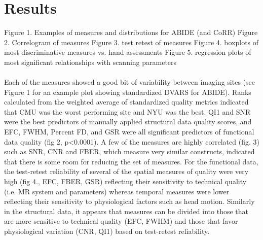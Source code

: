 \documentclass{frontiersSCNS} %
\begin{document}
\section{Results}
\label{sec:25}
Figure 1. Examples of measures and distributions for ABIDE (and CoRR)
Figure 2. Correlogram of measures
Figure 3. test retest of measures
Figure 4. boxplots of most discriminative measures vs. hand assessments
Figure 5. regression plots of most significant relationships with scanning parameters
\\\\
Each of the measures showed a good bit of variability between imaging sites (see Figure 1 for an example plot showing standardized DVARS for ABIDE). Ranks calculated from the weighted average of standardized quality metrics indicated that CMU was the worst performing site and NYU was the best. QI1 and SNR were the best predictors of manually applied structural data quality scores, and EFC, FWHM, Percent FD, and GSR were all significant predictors of functional data quality (fig 2, p<0.0001). A few of the measures are highly correlated (fig. 3) such as SNR, CNR and FBER, which measure very similar constructs, indicated that there is some room for reducing the set of measures. For the functional data, the test­-retest reliability of several of the spatial measures of quality were very high (fig 4., EFC, FBER, GSR) reflecting their sensitivity to technical quality (i.e. MR system and parameters) whereas temporal measures were lower reflecting their sensitivity to physiological factors such as head motion. Similarly in the structural data, it appears that measures can be divided into those that are more sensitive to technical quality (EFC, FWHM) and those that favor physiological variation (CNR, QI1) based on test­-retest reliability.
\end{document}
